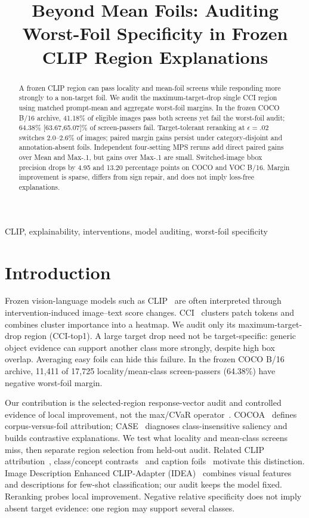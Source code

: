 \documentclass[10pt]{article}
\title{Beyond Mean Foils: Auditing Worst-Foil Specificity in Frozen CLIP Region Explanations}
\begin{document}
\maketitle

\begin{abstract}
A frozen CLIP region can pass locality and mean-foil screens while responding
more strongly to a non-target foil. We audit the maximum-target-drop single
CCI region using matched prompt-mean and aggregate worst-foil margins.
In the frozen COCO B/16 archive, 41.18\% of eligible images pass both screens
yet fail the worst-foil audit; 64.38\% [63.67,65.07]\% of screen-passers fail.
Target-tolerant reranking at $\epsilon=.02$ switches 2.0--2.6\% of images;
paired margin gains persist under category-disjoint and annotation-absent foils.
Independent four-setting MPS reruns add direct paired gains over Mean and
Max-.1, but gains over Max-.1 are small. Switched-image bbox precision drops
by 4.95 and 13.20 percentage points on COCO and VOC B/16.
Margin improvement is sparse, differs from sign repair, and does not imply
loss-free explanations.

\end{abstract}
\begin{keywords}
CLIP, explainability, interventions, model auditing, worst-foil specificity
\end{keywords}

\section{Introduction}
Frozen vision-language models such as CLIP~\cite{radford2021clip} are often
interpreted through intervention-induced image--text score changes.
CCI~\cite{agarwal2025cci} clusters patch tokens and combines cluster importance
into a heatmap. We audit only its maximum-target-drop region (CCI-top1).
A large target drop need not be target-specific: generic object evidence can
support another class more strongly, despite high box overlap. Averaging easy
foils can hide this failure. In the frozen COCO B/16 archive, 11,411 of 17,725
locality/mean-class screen-passers (64.38\%) have negative worst-foil margin.

Our contribution is the selected-region response-vector audit and controlled
evidence of local improvement, not the max/CVaR operator~\cite{rockafellar2000cvar}.
COCOA~\cite{lin2023cocoa} defines corpus-versus-foil attribution;
CASE~\cite{williamson2025case} diagnoses class-insensitive saliency and builds
contrastive explanations. We test what locality and mean-class screens miss,
then separate region selection from held-out audit.
Related CLIP attribution~\cite{wang2023m2ib,li2023clipsurgery,dreyer2025cliplatent},
class/concept contrasts~\cite{li2026cdaclip,cheng2026mgaclip,visser2026contrastiveconcept}
and caption foils~\cite{yuksekgonul2023aro} motivate this distinction.
Image Description Enhanced CLIP-Adapter (IDEA)~\cite{ye2026idea} combines visual
features and descriptions for few-shot classification; our audit keeps the
model fixed. Reranking probes local improvement. Negative relative specificity
does not imply absent target evidence: one region may support several classes.
\end{document}
